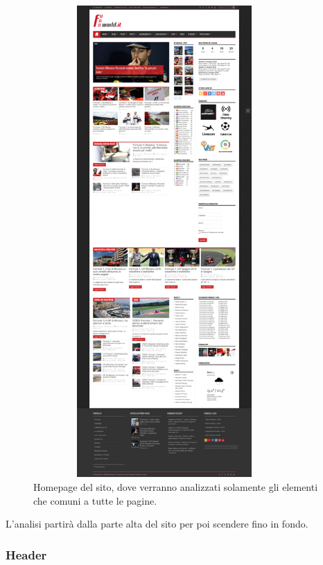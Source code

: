 \begin{figure}[H]
  \centering
  \includegraphics[height=18cm, width=10cm]{res/img/HomePage_Full}
  \caption{Homepage del sito, dove verranno analizzati solamente gli elementi che comuni a tutte le pagine.}
\end{figure}

L'analisi partir\`a dalla parte alta del sito per poi scendere fino in fondo.

\subsubsection{Header}


